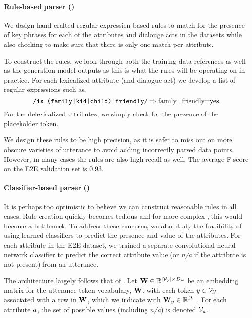 \paragraph{Rule-based parser ()} We design hand-crafted regular
expression based rules to match for the presence of key phrases for each of the
attributes and dialouge acts in the datasets while also checking to make sure
that there is only one match per attribute.

To construct the rules, we look through both the training data references as
well as the generation model outputs as this is what the rules will be
operating on in practice. For each lexicalized attribute (and dialogue act) we
develop a list of regular expressions such as,\[
\texttt{/is (family|kid|child) friendly/} \Rightarrow \textrm{family\_friendly=yes}.\]
For the delexicalized attributes, we simply check for the presence of the
placeholder token. 

We design these rules to be high precision, as it is safer to miss out on 
more obscure varieties of utterance to avoid adding incorrectly parsed data 
points.
However,  in many cases the rules are also high recall as well. 
The average F-score on the E2E validation set is 0.93.

\paragraph{Classifier-based parser (\learndmodel)} 

It is perhaps too optimistic to believe we can construct reasonable rules in
all cases. Rule creation quickly becomes tedious and for more complex
\meaningrepresentations, this would become a bottleneck. To address these
concerns, we also study the feasibility of using learned classifiers to predict
the presence and value of the attributes. For each attribute in the E2E
dataset, we trained a separate convolutional neural network classifier to
predict the correct attribute value (or \textit{n/a} if the attribute is not
present) from an utterance.

The architecture largely follows that of \citet{kim2014convolutional}.  Let
$\mathbf{W} \in \mathbb{R}^{{\left\vert \mathcal{V}_{\mathcal{Y}} \right\vert} \times D_w}$ be an embedding
matrix for the utterance token vocabulary, $\mathbf{W}$, with each token $y
\in \mathcal{V}_{\mathcal{Y}}$ associated with a row in $\mathbf{W}$, which we indicate with
$\mathbf{W}_y \in \mathbb{R}^{D_w}$.  For each attribute $a$, the
set of possible values (including \textit{n/a}) is denoted ${\mathcal{V}_{a}}$.

